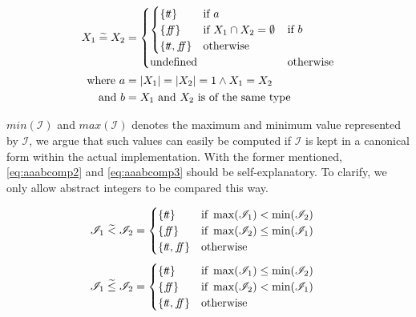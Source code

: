 \begin{align} \nonumber
    X_1 \;\aab{=}\; X_2 &= \begin{cases}
        \begin{cases}
        \{\true\} & \text{if } a\\
        \{\false\} & \text{if } X_1 \cap X_2 = \emptyset \\
        \{\true, \false\} & \text{otherwise }
        \end{cases} & \text{if $b$} \\
        \text{undefined} & \text{otherwise}
    \end{cases}\\
    \text{where } a&=|X_1| = |X_2| = 1 \land X_1 = X_2 \nonumber\\
    \text{and } b&=X_1 \text{ and } X_2 \text{ is of the same type}
    \label{eq:aaabcomp}
\end{align}

$min(\mathscr{I})$ and $max(\mathscr{I})$ denotes the maximum and minimum value represented by $\mathscr{I}$, we argue that such values can easily be computed if $\mathscr{I}$ is kept in a canonical form within the actual implementation.
With the former mentioned, \autoref{eq:aaabcomp2} and \ref{eq:aaabcomp3} should be self-explanatory.
To clarify, we only allow abstract integers to be compared this way.

\begin{align}\label{eq:aaabcomp2}
    \mathscr{I}_1 \;\aab{<}\; \mathscr{I}_2 &= \begin{cases}
        \{\true\} & \text{if } \max(\mathscr{I}_1) < \min(\mathscr{I}_2) \\
        \{\false\} & \text{if } \max(\mathscr{I}_2) \leq \min (\mathscr{I}_1) \\
        \{\true, \false\} & \text{otherwise}
    \end{cases}
\end{align}
\begin{align}\label{eq:aaabcomp3}
    \mathscr{I}_1 \;\aab{\leq}\; \mathscr{I}_2 &= \begin{cases}
        \{\true\} & \text{if } \max(\mathscr{I}_1) \leq \min(\mathscr{I}_2) \\
        \{\false\} & \text{if } \max(\mathscr{I}_2) < \min (\mathscr{I}_1) \\
        \{\true, \false\} & \text{otherwise}
    \end{cases}
\end{align}

